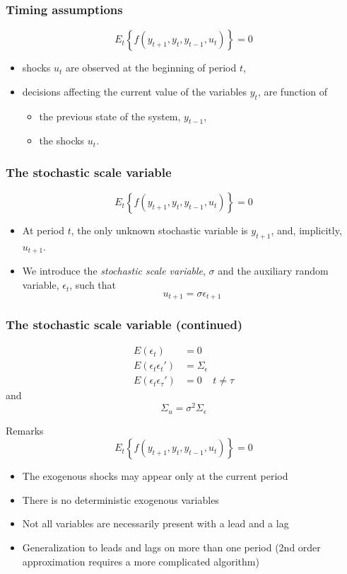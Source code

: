 \documentclass{beamer}
\begin{document}
\begin{frame} \frametitle{Timing assumptions}
  \[
  E_t\left\{f(y_{t+1},y_t,y_{t-1},u_t)\right\}=0
  \]
  \begin{itemize}
  \item shocks $u_t$ are observed at the beginning of period $t$,
  \item decisions affecting the current value of the variables $y_t$, are function of
    \begin{itemize}
    \item the previous state of the system, $y_{t-1}$,
    \item the shocks $u_t$.
    \end{itemize}
  \end{itemize}
\end{frame}

\begin{frame} \frametitle{The stochastic scale variable}
\[
E_t\left\{f(y_{t+1},y_t,y_{t-1},u_t)\right\}=0
\]
\begin{itemize}
\item At period $t$, the only unknown stochastic variable is $y_{t+1}$, and, implicitly, $u_{t+1}$.
\item We introduce the \emph{stochastic scale variable}, $\sigma$ and the auxiliary random variable, $\epsilon_t$, such that
\[
u_{t+1} = \sigma\epsilon_{t+1}
\]
\end{itemize}
\end{frame}

\begin{frame} \frametitle{The stochastic scale variable (continued)}
\begin{align}
E(\epsilon_t) &= 0\\
E(\epsilon_t\epsilon_t') &= \Sigma_\epsilon\\
E(\epsilon_t\epsilon_\tau') &= 0\;\;\;\;t\ne\tau  
\end{align}
and
\[
\Sigma_u = \sigma^2\Sigma_\epsilon
\]
\end{frame}


\begin{slide}{Remarks}
\[
E_t\left\{f(y_{t+1},y_t,y_{t-1},u_t)\right\}=0
\]
  \begin{itemize}
  \item The exogenous shocks may appear only at the current period
  \item There is no deterministic exogenous variables
  \item Not all variables are necessarily present with a lead and a lag
  \item Generalization to leads and lags on more than one period (2nd order approximation requires a more complicated algorithm)
  \end{itemize}
\end{slide}
\end{document}
